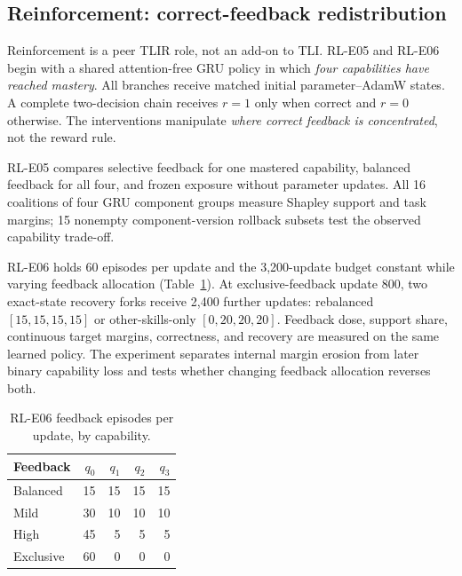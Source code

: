 \documentclass{article}
\begin{document}
\subsection{Reinforcement: correct-feedback redistribution}
Reinforcement is a peer TLIR role, not an add-on to TLI. RL-E05 and RL-E06 begin with a shared attention-free GRU policy in which \emph{four capabilities have reached mastery}. All branches receive matched initial parameter--AdamW states. A complete two-decision chain receives $r=1$ only when correct and $r=0$ otherwise. The interventions manipulate \emph{where correct feedback is concentrated}, not the reward rule.

RL-E05 compares selective feedback for one mastered capability, balanced feedback for all four, and frozen exposure without parameter updates. All 16 coalitions of four GRU component groups measure Shapley support and task margins; 15 nonempty component-version rollback subsets test the observed capability trade-off.

RL-E06 holds 60 episodes per update and the 3,200-update budget constant while varying feedback allocation (Table~\ref{tab:dose}). At exclusive-feedback update 800, two exact-state recovery forks receive 2,400 further updates: rebalanced $[15,15,15,15]$ or other-skills-only $[0,20,20,20]$. Feedback dose, support share, continuous target margins, correctness, and recovery are measured on the same learned policy. The experiment separates internal margin erosion from later binary capability loss and tests whether changing feedback allocation reverses both.
\begin{table}[t]
\centering\small\setlength{\tabcolsep}{4.1pt}\renewcommand{\arraystretch}{1.08}
\begin{tabular}{@{}lrrrr@{}}\toprule
Feedback & $q_0$ & $q_1$ & $q_2$ & $q_3$\\\midrule
Balanced & 15 & 15 & 15 & 15\\
Mild & 30 & 10 & 10 & 10\\
High & 45 & 5 & 5 & 5\\
Exclusive & 60 & 0 & 0 & 0\\\bottomrule
\end{tabular}
\caption{RL-E06 feedback episodes per update, by capability.}
\label{tab:dose}\end{table}
\end{document}
